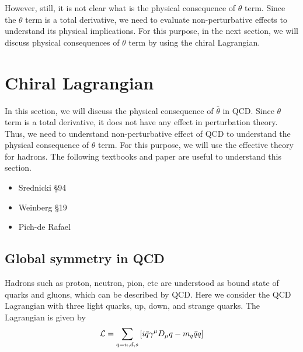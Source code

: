 \documentclass[11pt,a4paper]{article}
\begin{document}
However, still, it is not clear what is the physical consequence of $\theta$ term. Since the $\theta$ term is a total derivative, we need to evaluate non-perturbative effects to understand its physical implications. For this purpose, in the next section, we will discuss physical consequences of $\theta$ term by using the chiral Lagrangian.

\section{Chiral Lagrangian}\label{sec:chpt}
In this section, we will discuss the physical consequence of $\bar\theta$ in QCD. Since $\theta$ term is a total derivative, it does not have any effect in perturbation theory. Thus, we need to understand non-perturbative effect of QCD to understand the physical consequence of $\theta$ term. For this purpose, we will use the effective theory for hadrons. 
The following textbooks and paper are useful to understand this section.
\begin{itemize}
\item Srednicki  \cite{Srednicki:2007qs} \S 94
\item Weinberg \cite{Weinberg:1996kr} \S 19
\item Pich-de Rafael \cite{Pich:1991fq}
\end{itemize}


\subsection{Global symmetry in QCD}
Hadrons such as proton, neutron, pion, etc are understood as bound state of quarks and gluons, which can be described by QCD. Here we consider the QCD Lagrangian with three light quarks, up, down, and strange quarks. The Lagrangian is given by
\begin{align}
    {\cal L} = \sum_{q=u,d,s} \left[ i\bar q \gamma^\mu D_\mu q - m_q \bar q q \right]
\end{align}
\end{document}
